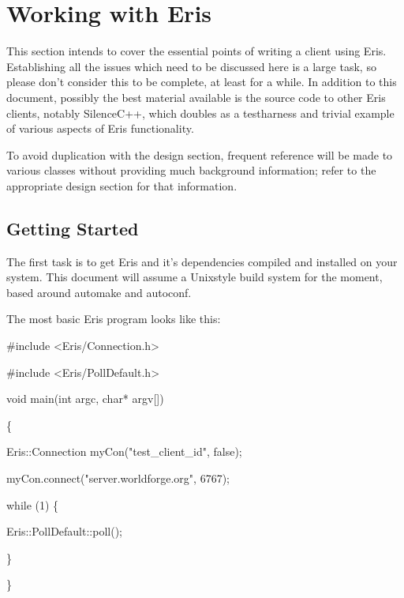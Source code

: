 \section{Working with Eris}



This section intends to cover the essential points of writing a client using Eris. Establishing
all the issues which need to be discussed here is a large task, so please don't consider
this to be complete, at least for a while. In addition to this document, possibly
the best material available is the source code to other Eris clients, notably SilenceC++,
which doubles as a testharness and trivial example of various aspects of Eris functionality.



To avoid duplication with the design section, frequent reference will be made to various
classes without providing much background information; refer to the appropriate design section
for that information.



\subsection{Getting Started}

The first task is to get Eris and it's dependencies compiled and installed on your system.
This document will assume a Unixstyle build system for the moment, based around
automake and autoconf.



The most basic Eris program looks like this:

{\tt



\#include <Eris/Connection.h>

\#include <Eris/PollDefault.h>



void main(int argc, char* argv[])

\{

    Eris::Connection myCon("test\myback\_client\myback\_id", false);

    

    myCon.connect("server.worldforge.org", 6767);

    

    while (1) \{

	Eris::PollDefault::poll();

    \}

\}

}



